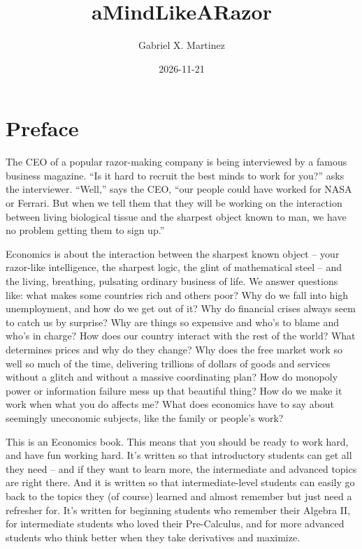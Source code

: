\documentclass[
  letterpaper,
  DIV=11,
  numbers=noendperiod]{scrreprt}
\title{aMindLikeARazor}
\author{Gabriel X. Martinez}
\date{2026-11-21}
\renewcommand*\contentsname{Table of contents}
\newcommand\contentsname{Table of contents}
\begin{document}
\maketitle

\renewcommand*\contentsname{Table of contents}
{
\setcounter{tocdepth}{2}
\tableofcontents
}


\chapter*{Preface}\label{preface}


The CEO of a popular razor-making company is being interviewed by a
famous business magazine. ``Is it hard to recruit the best minds to work
for you?'' asks the interviewer. ``Well,'' says the CEO, ``our people
could have worked for NASA or Ferrari. But when we tell them that they
will be working on the interaction between living biological tissue and
the sharpest object known to man, we have no problem getting them to
sign up.''

Economics is about the interaction between the sharpest known object --
your razor-like intelligence, the sharpest logic, the glint of
mathematical steel -- and the living, breathing, pulsating ordinary
business of life. We answer questions like: what makes some countries
rich and others poor? Why do we fall into high unemployment, and how do
we get out of it? Why do financial crises always seem to catch us by
surprise? Why are things so expensive and who's to blame and who's in
charge? How does our country interact with the rest of the world? What
determines prices and why do they change? Why does the free market work
so well so much of the time, delivering trillions of dollars of goods
and services without a glitch and without a massive coordinating plan?
How do monopoly power or information failure mess up that beautiful
thing? How do we make it work when what you do affects me? What does
economics have to say about seemingly uneconomic subjects, like the
family or people's work?

This is an Economics book. This means that you should be ready to work
hard, and have fun working hard. It's written so that introductory
students can get all they need -- and if they want to learn more, the
intermediate and advanced topics are right there. And it is written so
that intermediate-level students can easily go back to the topics they
(of course) learned and almost remember but just need a refresher for.
It's written for beginning students who remember their Algebra II, for
intermediate students who loved their Pre-Calculus, and for more
advanced students who think better when they take derivatives and
maximize.
\end{document}
